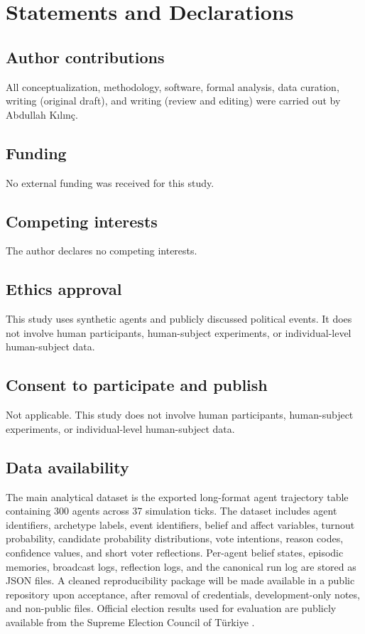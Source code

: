 \documentclass[pdflatex,sn-mathphys-num,iicol]{sn-jnl}
\begin{document}
\section*{Statements and Declarations}

\subsection*{Author contributions}
All conceptualization, methodology, software, formal analysis, data curation,
writing (original draft), and writing (review and editing) were carried out by
Abdullah Kılınç.

\subsection*{Funding}
No external funding was received for this study.

\subsection*{Competing interests}
The author declares no competing interests.

\subsection*{Ethics approval}
This study uses synthetic agents and publicly discussed political events. It
does not involve human participants, human-subject experiments, or
individual-level human-subject data.

\subsection*{Consent to participate and publish}
Not applicable. This study does not involve human participants,
human-subject experiments, or individual-level human-subject data.

\subsection*{Data availability}
The main analytical dataset is the exported long-format agent trajectory table
containing 300 agents across 37 simulation ticks. The dataset includes agent
identifiers, archetype labels, event identifiers, belief and affect variables,
turnout probability, candidate probability distributions, vote intentions, reason
codes, confidence values, and short voter reflections. Per-agent belief states,
episodic memories, broadcast logs, reflection logs, and the canonical run log
are stored as JSON files. A cleaned reproducibility package will be made
available in a public repository upon acceptance, after removal of credentials,
development-only notes, and non-public files. Official election results used for
evaluation are publicly available from the Supreme Election Council of Türkiye
\cite{ysk2023}.
\end{document}

